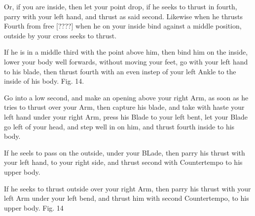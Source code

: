 \exercise{}

Or, if you are inside, then let your point drop, if he seeks to thrust
in fourth, parry with your left hand, and thrust as said
second. Likewise when he thrusts Fourth from free [????] when he on
your inside bind against a middle position, outside by your cross
seeks to thrust.

\exercise{}
If he is in a middle third with the point above him, then bind him on
the inside, lower your body well forwards, without moving your feet,
go with your left hand to his blade, then thrust fourth with an even
instep of your left Ankle to the inside of his body. Fig. 14.

\exercise{}
Go into a low second, and make an opening above your right Arm, as
soon as he tries to thrust over your Arm, then capture his blade, and
take with haste your left hand under your right Arm, press his Blade
to your left bent, let your Blade go left of your head, and step well
in on him, and thrust fourth inside to his body.

\exercise{}
If he seels to pass on the outside, under your BLade, then parry his
thrust with your left hand, to your right side, and thrust second with
Countertempo to his upper body.

\exercise{}
If he seeks to thrust outside over your right Arm, then parry his
thrust with your left Arm under your left bend, and thrust him with
second Countertempo, to his upper body. Fig. 14
